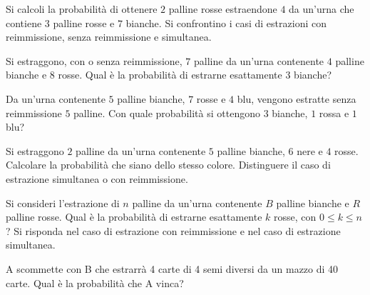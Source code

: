 \Esercizio{}

Si calcoli la probabilità di ottenere $2$ palline rosse estraendone $4$ da un'urna che contiene $3$ palline rosse e $7$ bianche. Si confrontino i casi di estrazioni con reimmissione, senza reimmissione e simultanea.
\Esercizio{}

Si estraggono, con o senza reimmissione, $7$ palline da un'urna contenente $4$ palline bianche e $8$ rosse. Qual è la probabilità di estrarne esattamente $3$ bianche?
\Esercizio{}

Da un'urna contenente $5$ palline bianche, $7$ rosse e $4$ blu, vengono estratte senza reimmissione $5$ palline. Con quale probabilità si ottengono $3$ bianche, $1$ rossa e $1$ blu?
\Esercizio{}

Si estraggono $2$ palline da un'urna contenente $5$ palline bianche, $6$ nere e $4$ rosse. Calcolare la probabilità che siano dello stesso colore. Distinguere il caso di estrazione simultanea o con reimmissione.
\Esercizio{}

Si consideri l'estrazione di $n$ palline da un'urna contenente $B$ palline bianche e $R$ palline rosse. Qual è la probabilità di estrarne esattamente $k$ rosse, con $0\leq k\leq n$? Si risponda nel caso di estrazione con reimmissione e nel caso di estrazione simultanea.
\Esercizio{}

A scommette con B che estrarrà 4 carte di 4 semi diversi da un mazzo di 40 carte. Qual è la probabilità che A vinca?
\Esercizio{}

